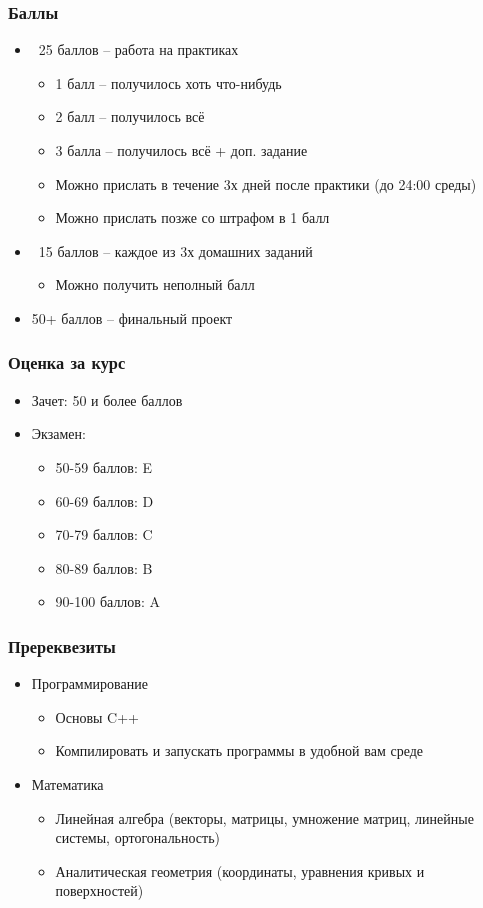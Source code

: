 \documentclass{beamer}
\begin{document}
\begin{frame}
\frametitle{Баллы}
\begin{itemize}
\pause
\item ~25 баллов -- работа на практиках
\pause
\begin{itemize}
\item 1 балл -- получилось хоть что-нибудь
\item 2 балл -- получилось всё
\item 3 балла -- получилось всё + доп. задание
\pause
\item Можно прислать в течение 3х дней после практики (до 24:00 среды)
\pause
\item Можно прислать позже со штрафом в 1 балл
\end{itemize}
\pause
\item ~15 баллов -- каждое из 3х домашних заданий
\pause
\begin{itemize}
\item Можно получить неполный балл
\end{itemize}
\pause
\item 50+ баллов -- финальный проект
\end{itemize}
\end{frame}

\begin{frame}
\frametitle{Оценка за курс}
\pause
\begin{itemize}
\item Зачет: 50 и более баллов
\pause
\item Экзамен:
\begin{itemize}
\item 50-59 баллов: E
\item 60-69 баллов: D
\item 70-79 баллов: C
\item 80-89 баллов: B
\item 90-100 баллов: A
\end{itemize}
\end{itemize}
\end{frame}

\begin{frame}
\frametitle{Пререквезиты}
\pause
\begin{itemize}
\item Программирование
\pause
\begin{itemize}
\item Основы C++
\pause
\item Компилировать и запускать программы в удобной вам среде
\end{itemize}
\pause
\item Математика
\pause
\begin{itemize}
\item Линейная алгебра (векторы, матрицы, умножение матриц, линейные системы, ортогональность)
\pause
\item Аналитическая геометрия (координаты, уравнения кривых и поверхностей)
\end{itemize}
\end{itemize}
\end{frame}
\end{document}
